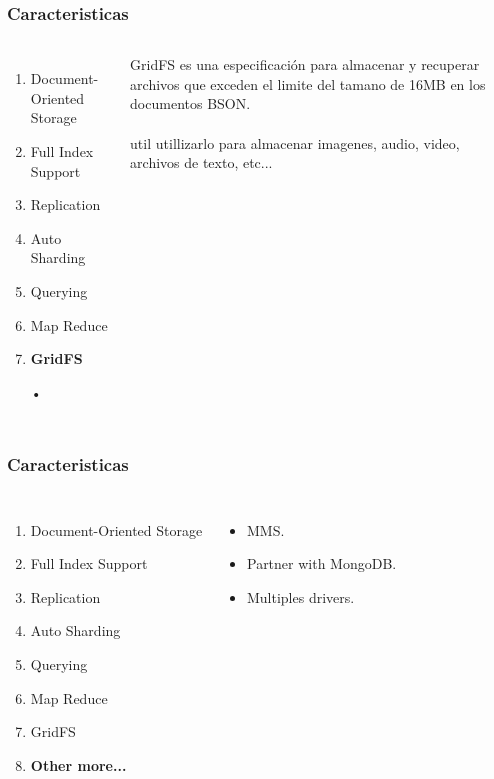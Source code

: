 \documentclass{beamer}
\begin{document}
\begin{frame}
\frametitle{Caracteristicas}
\begin{columns}[c] %

\begin{enumerate}
\item Document-Oriented Storage
\item Full Index Support
\item Replication
\item Auto Sharding
\item Querying
\item Map Reduce
\item \textbf{GridFS}
\item[•]	
\end{enumerate}

GridFS es una especificaci\'on para almacenar y recuperar archivos que exceden el limite del tamano de 16MB en los documentos BSON.
\\~\\
util utillizarlo para almacenar imagenes, audio, video, archivos de texto, etc...
\end{columns}
\end{frame}


\begin{frame}
\frametitle{Caracteristicas}
\begin{columns}[c] %

\begin{enumerate}
\item Document-Oriented Storage
\item Full Index Support
\item Replication
\item Auto Sharding
\item Querying
\item Map Reduce
\item GridFS
\item \textbf{Other more...}
\end{enumerate}

\begin{itemize}
\item MMS.
\item Partner with MongoDB.
\item Multiples drivers.
\end{itemize}

\end{columns}
\end{frame}
\end{document}
